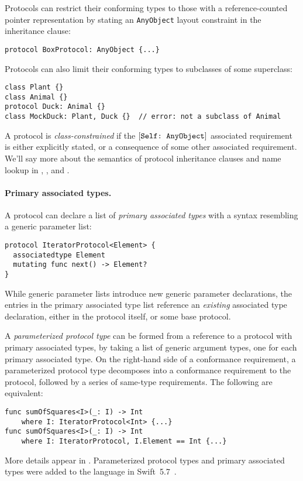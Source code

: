 \documentclass[../generics]{subfiles}
\begin{document}
Protocols can restrict their conforming types to those with a reference-counted pointer representation by stating an \texttt{AnyObject} layout constraint in the inheritance clause:
\begin{Verbatim}
protocol BoxProtocol: AnyObject {...}
\end{Verbatim}

Protocols can also limit their conforming types to subclasses of some superclass:
\begin{Verbatim}
class Plant {}
class Animal {}
protocol Duck: Animal {}
class MockDuck: Plant, Duck {}  // error: not a subclass of Animal
\end{Verbatim}
A protocol is \emph{class-constrained} if the $[\texttt{Self:~AnyObject}]$ associated requirement is either explicitly stated, or a consequence of some other associated requirement. We'll say more about the semantics of protocol inheritance clauses and name lookup in , , and .

\paragraph{Primary associated types.}
A protocol can declare a list of \emph{primary associated types} with a syntax resembling a generic parameter list:
\begin{Verbatim}
protocol IteratorProtocol<Element> {
  associatedtype Element
  mutating func next() -> Element?
}
\end{Verbatim}
While generic parameter lists introduce new generic parameter declarations, the entries in the primary associated type list reference an \emph{existing} associated type declaration, either in the protocol itself, or some base protocol.

A \emph{parameterized protocol type} can be formed from a reference to a protocol with primary associated types, by taking a list of generic argument types, one for each primary associated type. On the right-hand side of a conformance requirement, a parameterized protocol type decomposes into a conformance requirement to the protocol, followed by a series of same-type requirements. The following are equivalent:
\begin{Verbatim}
func sumOfSquares<I>(_: I) -> Int
    where I: IteratorProtocol<Int> {...}
func sumOfSquares<I>(_: I) -> Int
    where I: IteratorProtocol, I.Element == Int {...}
\end{Verbatim}
More details appear in . Parameterized protocol types and primary associated types were added to the language in Swift~5.7~\cite{se0346}. 
\end{document}
